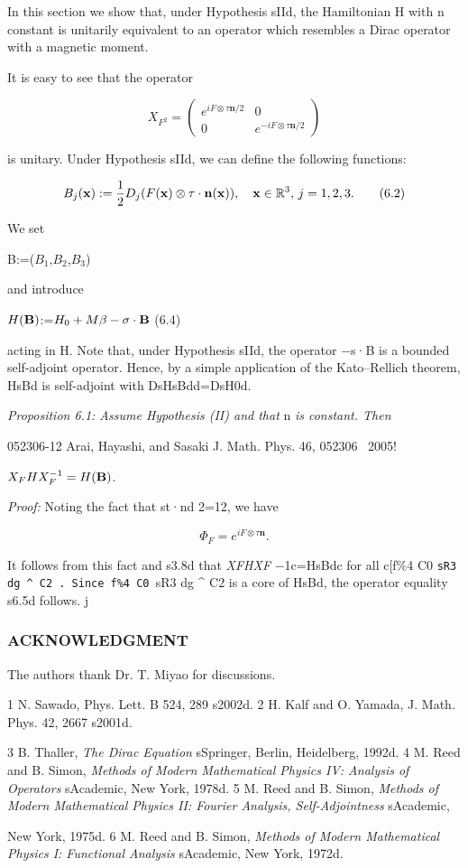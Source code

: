\documentclass{article}
\begin{document}
In this section we show that, under Hypothesis sIId, the Hamiltonian H with n constant is unitarily equivalent to an operator which resembles a Dirac operator with a magnetic moment.

It is easy to see that the operator

$$X_{F^{2}}{=}\begin{pmatrix}e^{iF\otimes\tau\mathbf{n}/2}&0\\ 0&e^{-iF\otimes\tau\mathbf{n}/2}\end{pmatrix}\tag{6.1}$$

is unitary. Under Hypothesis sIId, we can define the following functions:

$$B_{j}({\bf x}):=\frac{1}{2}D_{j}(F({\bf x})\otimes\tau\cdot{\bf n}({\bf x})),\quad{\bf x}\in\mathbb{R}^{3},\,j=1,2,3.\tag{6.2}$$

We set

B:=($B_{1}$,$B_{2}$,$B_{3}$)

and introduce

$H({\bf B})$:=$H_{0}+M\beta-\sigma\cdot{\bf B}$ (6.4)

acting in H. Note that, under Hypothesis sIId, the operator −s·B is a bounded self-adjoint operator. Hence, by a simple application of the Kato–Rellich theorem, HsBd is self-adjoint with DsHsBdd=DsH0d.

\textit{Proposition 6.1: Assume Hypothesis (II) and that} n \textit{is constant. Then}

052306-12 Arai, Hayashi, and Sasaki J. Math. Phys. 46, 052306 ~2005!

$X_{F}HX_{F}^{-1}=H({\bf B})$.

\textit{Proof:} Noting the fact that st·nd 2=12, we have

$$\Phi_{F}=e^{i F\otimes\tau\mathbf{n}}.$$

It follows from this fact and s3.8d that \textit{XFHXF} −1c=HsBdc for all c[f\%4 C0 \verb|sR3 dg ^ C2 . Since f%4 C0 |sR3 dg ^ C2 is a core of HsBd, the operator equality s6.5d follows. j

\subsubsection{\textbf{ACKNOWLEDGMENT}}

The authors thank Dr. T. Miyao for discussions.

1 N. Sawado, Phys. Lett. B 524, 289 s2002d. 2 H. Kalf and O. Yamada, J. Math. Phys. 42, 2667 s2001d.

3 B. Thaller, \textit{The Dirac Equation} sSpringer, Berlin, Heidelberg, 1992d. 4 M. Reed and B. Simon, \textit{Methods of Modern Mathematical Physics IV: Analysis of Operators} sAcademic, New York, 1978d. 5 M. Reed and B. Simon, \textit{Methods of Modern Mathematical Physics II: Fourier Analysis, Self-Adjointness} sAcademic,

New York, 1975d. 6 M. Reed and B. Simon, \textit{Methods of Modern Mathematical Physics I: Functional Analysis} sAcademic, New York, 1972d.
\end{document}
